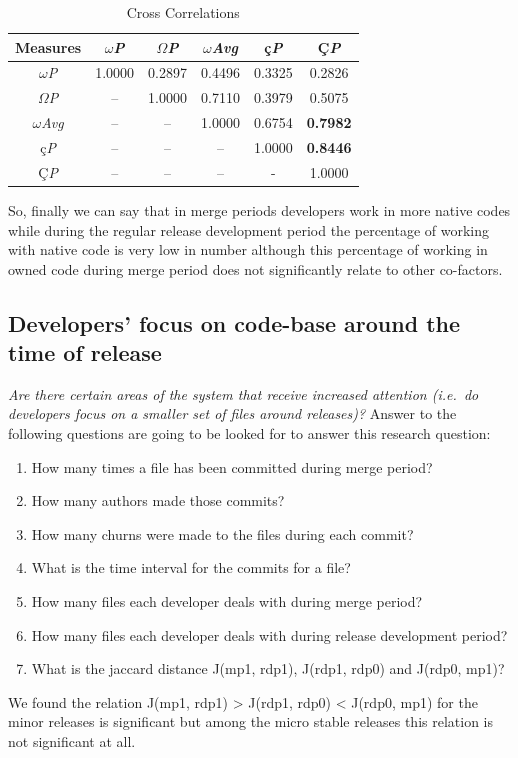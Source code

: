 \documentclass{acm_proc_article-sp}
\begin{document}
\begin{table}[ht]
\caption{Cross Correlations}  %
\centering 						%
\begin{tabular}{c c c c c c}			%
\hline\hline						%
Measures  & $\omega$\textit{P} & $\Omega$\textit{P} & $\omega$\textit{Avg} & \c{c}\textit{P} & \c{C}\textit{P} \\ [0.5ex]
\hline 							%
$\omega$\textit{P}		& 1.0000	& 0.2897	& 0.4496	& 0.3325	& 0.2826 \\
$\Omega$\textit{P}	& --			& 1.0000	& 0.7110	& 0.3979	& 0.5075 \\
$\omega$\textit{Avg}	& --			& --			& 1.0000 	& 0.6754 	& \textbf{0.7982} \\
\c{c}\textit{P}			& -- 			& -- 		 	& --			& 1.0000	& \textbf{0.8446} \\
\c{C}\textit{P}			& -- 			& -- 			& -- 			& -			& 1.0000 \\
[1ex]							%
\hline 							%
\end{tabular}
\label{table:nonlin} 				%
\end{table}

So, finally we can say that in merge periods developers work in more native codes while during the regular release development period the percentage of working with native code is very low in number although this percentage of working in owned code during merge period does not significantly relate to other co-factors.

\subsection{Developers' focus on code-base around the time of release}
\textit{Are there certain areas of the system that receive increased attention (i.e.\ do developers focus on a smaller set of files around releases)?}
Answer to the following questions are going to be looked for to answer this research question:
\renewcommand{\labelenumi}{q\theenumi:}
\begin{enumerate}
\item{How many times a file has been committed during merge period?}
\item{How many authors made those commits?}
\item{How many churns were made to the files during each commit?}
\item{What is the time interval for the commits for a file?}
\item{How many files each developer deals with during merge period?}
\item{How many files each developer deals with during release development period?}
\item{What is the jaccard distance J(mp1, rdp1), J(rdp1, rdp0) and J(rdp0, mp1)?}
\end{enumerate}
We found the relation J(mp1, rdp1) > J(rdp1, rdp0) < J(rdp0, mp1) for the minor releases is significant but among the micro stable releases this relation is not significant at all.
\end{document}
